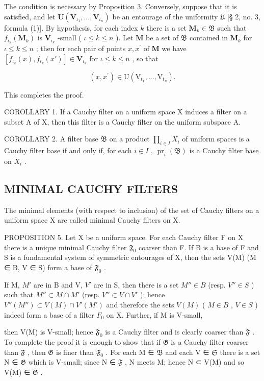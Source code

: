 The condition is necessary by Proposition 3. Conversely, suppose that it is satisfied, and let \(\mathbf{U}(\mathbf{V}_{\iota_1},\ldots ,\mathbf{V}_{\iota_n})\) be an entourage of the uniformity \(\mathfrak{U}\) {[}§ 2, no. 3, formula (1){]}. By hypothesis, for each index \(k\) there is a set \(\mathbf{M}_k\in \mathfrak{B}\) such that \(f_{\iota_k}(\mathbf{M}_k)\) is \(\mathbf{V}_{\iota_k}\) -small ( \(\iota \leqslant k\leqslant n\) ). Let \(\mathbf{M}\) be a set of \(\mathfrak{B}\) contained in \(\mathbf{M}_k\) for \(\iota \leqslant k\leqslant n\) ; then for each pair of points \(x,x^{\prime}\) of \(\mathbf{M}\) we have \([f_{\iota_k}(x),f_{\iota_k}(x')]\in \mathbf{V}_{\iota_k}\) for \(\iota \leqslant k\leqslant n\) , so that

\[
(x, x ^ {\prime}) \in \mathrm{U} (\mathrm{V} _ {t _ {1}}, \dots , \mathrm{V} _ {t _ {n}}).
\]

This completes the proof.

COROLLARY 1. If a Cauchy filter on a uniform space X induces a filter on a subset A of X, then this filter is a Cauchy filter on the uniform subspace A.

COROLLARY 2. A filter base \(\mathfrak{B}\) on a product \(\prod_{i\in I}X_i\) of uniform spaces is a Cauchy filter base if and only if, for each \(i\in I\) , \(\operatorname{pr}_i(\mathfrak{B})\) is a Cauchy filter base on \(X_i\) .

\subsection{MINIMAL CAUCHY FILTERS}

The minimal elements (with respect to inclusion) of the set of Cauchy filters on a uniform space X are called minimal Cauchy filters on X.

PROPOSITION 5. Let X be a uniform space. For each Cauchy filter F on X there is a unique minimal Cauchy filter \(\mathfrak{F}_0\) coarser than F. If B is a base of F and S is a fundamental system of symmetric entourages of X, then the sets V(M) (M ∈ B, V ∈ S) form a base of \(\mathfrak{F}_0\) .

If M, \(M'\) are in B and V, \(V'\) are in S, then there is a set \(M'' \in B\) (resp. \(V'' \in S\) ) such that \(M'' \subset M \cap M'\) (resp. \(V'' \subset V \cap V'\) ); hence \(V''(M'') \subset V(M) \cap V'(M')\) and therefore the sets \(V(M)\) ( \(M \in B\) , \(V \in S\) ) indeed form a base of a filter \(F_0\) on X. Further, if M is V-small,

then V(M) is V-small; hence \(\mathfrak{F}_0\) is a Cauchy filter and is clearly coarser than \(\mathfrak{F}\) . To complete the proof it is enough to show that if \(\mathfrak{G}\) is a Cauchy filter coarser than \(\mathfrak{F}\) , then \(\mathfrak{G}\) is finer than \(\mathfrak{F}_0\) . For each M ∈ \(\mathfrak{B}\) and each V ∈ \(\mathfrak{S}\) there is a set N ∈ \(\mathfrak{G}\) which is V-small; since N ∈ \(\mathfrak{F}\) , N meets M; hence N ⊂ V(M) and so V(M) ∈ \(\mathfrak{G}\) .

